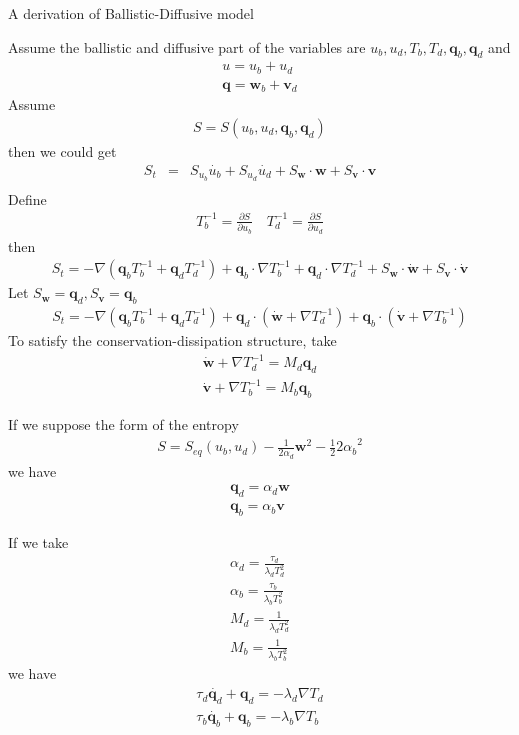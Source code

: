 \documentclass[a4paper]{letter}
\begin{document}
A derivation of Ballistic-Diffusive model

Assume the ballistic and diffusive part of the variables are $u_b,u_d,T_b,T_d,\mathbf{q}_b,\mathbf{q}_d$ and
\begin{eqnarray}
u=u_b+u_d \\
\mathbf{q}=\mathbf{w}_b+\mathbf{v}_d
\end{eqnarray}
Assume
\begin{eqnarray}
S=S(u_b,u_d,\mathbf{q}_b,\mathbf{q}_d)
\end{eqnarray}
then we could get
\begin{eqnarray}
S_t &=& S_{u_b} \dot{u_b}+S_{u_d} \dot{u_d} +S_{\mathbf{w}} \cdot \mathbf{w} +S_{\mathbf{v}} \cdot \mathbf{v} \\
\end{eqnarray}
Define
\begin{eqnarray}
T_b^{-1}=\frac{\partial S}{\partial u_b} \quad T_d^{-1}=\frac{\partial S}{\partial u_d}
\end{eqnarray}
then
\begin{eqnarray}
S_t = -\nabla(\mathbf{q}_b T_b^{-1}+\mathbf{q}_d T_d^{-1})+\mathbf{q}_b \cdot \nabla T_b^{-1} +\mathbf{q}_d \cdot \nabla T_d^{-1} + S_{\mathbf{w}} \cdot \dot{\mathbf{w}} +S_{\mathbf{v}} \cdot \dot{\mathbf{v}}
\end{eqnarray}
Let $S_{\mathbf{w}}=\mathbf{q}_d,S_{\mathbf{v}}=\mathbf{q}_b$ 
\begin{eqnarray}
S_t = -\nabla(\mathbf{q}_b T_b^{-1}+\mathbf{q}_d T_d^{-1}) + \mathbf{q}_d \cdot (\dot{\mathbf{w}}+\nabla T_d^{-1})+\mathbf{q}_b \cdot (\dot{\mathbf{v}}+\nabla T_b^{-1})
\end{eqnarray}
To satisfy the conservation-dissipation structure, take
\begin{eqnarray}
\dot{\mathbf{w}}+\nabla T_d^{-1} = M_d \mathbf{q}_d \\
 \dot{\mathbf{v}}+\nabla T_b^{-1} = M_b \mathbf{q}_b
\end{eqnarray}


If we suppose the form of the entropy 
\begin{eqnarray}
S = S_{eq}(u_b,u_d) - \frac{1}{2\alpha_d} \mathbf{w}^2 -\frac{1}{2}{2\alpha_b}^2 
\end{eqnarray}
we have
\begin{eqnarray}
\mathbf{q}_d = \alpha_d \mathbf{w} \\
\mathbf{q}_b = \alpha_b \mathbf{v} 
\end{eqnarray}

If we take 
\begin{eqnarray}
\alpha_d = \frac{\tau_d}{\lambda_d T_d^2} \\
\alpha_b = \frac{\tau_b}{\lambda_b T_b^2} \\
M_d = \frac{1}{\lambda_d T_d^2} \\
M_b = \frac{1}{\lambda_b T_b^2}
\end{eqnarray}
we have
\begin{eqnarray}
\tau_d \dot{\mathbf{q}_d} +\mathbf{q}_d = -\lambda_d \nabla T_d \\
\tau_b \dot{\mathbf{q}_b} +\mathbf{q}_b = -\lambda_b \nabla T_b
\end{eqnarray}
\end{document}
